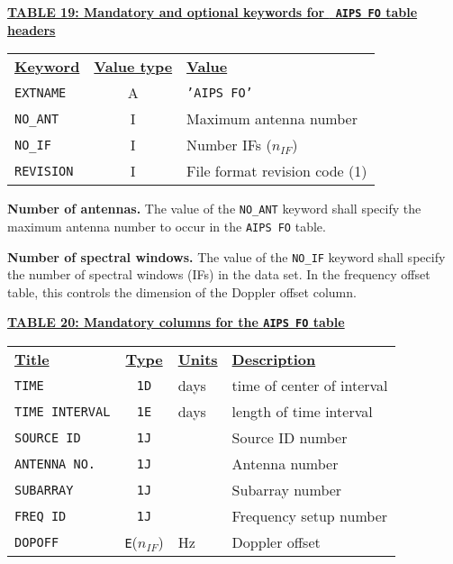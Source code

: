 \documentclass[twoside]{article}
\newcommand{\nif}{$n_{IF}$}
\begin{document}
\begin{center}
\underline{\bf{TABLE 19: Mandatory and optional keywords for {\tt
   AIPS FO} table headers}}\\
\begin{tabular}{lcl}
\noalign{\vspace{2pt}} \label{ta:FOkeys}
\underline{{\bf Keyword}} & \underline{\bf{Value type}} &
    \underline{\bf{Value\vphantom{y}}} \\
\noalign{\vspace{2pt}}
{\tt EXTNAME}   & A & {\tt 'AIPS FO'}  \\
{\tt NO\_ANT}   & I & Maximum antenna number \\
{\tt NO\_IF}    & I & Number IFs (\nif) \\
{\tt REVISION}  & I & File format revision code (1)
\end{tabular}
\end{center}

{\bf Number of antennas.} The value of the {\tt NO\_ANT} keyword shall
specify the maximum antenna number to occur in the {\tt AIPS FO} table.

{\bf Number of spectral windows.} The value of the {\tt NO\_IF}
keyword shall specify the number of spectral windows (IFs) in the data
set.  In the frequency offset table, this controls the dimension of
the Doppler offset column.

\begin{center}
\underline{\bf{TABLE 20: Mandatory columns for the {\tt AIPS FO} table}}\\
\begin{tabular}{lcll}
\noalign{\vspace{2pt}} \label{ta:FOcols}
\underline{{\bf Title\vphantom{y}}} & \underline{\bf{Type}} &
   \underline{{\bf Units\vphantom{y}}} & \underline{\bf{Description}} \\
\noalign{\vspace{2pt}}
{\tt TIME}        & {\tt 1D} & days    & time of center of interval \\
{\tt TIME INTERVAL} & {\tt 1E} & days & length of time interval \\
{\tt SOURCE ID}   & {\tt 1J} &  & Source ID number \\
{\tt ANTENNA NO.} & {\tt 1J} &  & Antenna number \\
{\tt SUBARRAY}    & {\tt 1J} &  & Subarray number \\
{\tt FREQ ID}     & {\tt 1J} &  & Frequency setup number \\
{\tt DOPOFF}      & {\tt E}(\nif) & Hz & Doppler offset
\end{tabular}
\end{center}
\end{document}
